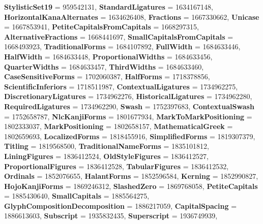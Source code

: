 \begin{DoxyCompactItemize}
{\bfseries Stylistic\+Set19} = 959542131, 
{\bfseries Standard\+Ligatures} = 1634167148, 
{\bfseries Horizontal\+Kana\+Alternates} = 1634626408, 
\newline
{\bfseries Fractions} = 1667330662, 
{\bfseries Unicase} = 1667853941, 
{\bfseries Petite\+Capitals\+From\+Capitals} = 1668297315, 
{\bfseries Alternative\+Fractions} = 1668441697, 
\newline
{\bfseries Small\+Capitals\+From\+Capitals} = 1668493923, 
{\bfseries Traditional\+Forms} = 1684107892, 
{\bfseries Full\+Width} = 1684633446, 
{\bfseries Half\+Width} = 1684633448, 
\newline
{\bfseries Proportional\+Widths} = 1684633456, 
{\bfseries Quarter\+Widths} = 1684633457, 
{\bfseries Third\+Widths} = 1684633460, 
{\bfseries Case\+Sensitive\+Forms} = 1702060387, 
\newline
{\bfseries Half\+Forms} = 1718378856, 
{\bfseries Scientific\+Inferiors} = 1718511987, 
{\bfseries Contextual\+Ligatures} = 1734962275, 
{\bfseries Discretionary\+Ligatures} = 1734962276, 
\newline
{\bfseries Historical\+Ligatures} = 1734962280, 
{\bfseries Required\+Ligatures} = 1734962290, 
{\bfseries Swash} = 1752397683, 
{\bfseries Contextual\+Swash} = 1752658787, 
\newline
{\bfseries Nlc\+Kanji\+Forms} = 1801677934, 
{\bfseries Mark\+To\+Mark\+Positioning} = 1802333037, 
{\bfseries Mark\+Positioning} = 1802658157, 
{\bfseries Mathematical\+Greek} = 1802659693, 
\newline
{\bfseries Localized\+Forms} = 1818455916, 
{\bfseries Simplified\+Forms} = 1819307379, 
{\bfseries Titling} = 1819568500, 
{\bfseries Traditional\+Name\+Forms} = 1835101812, 
\newline
{\bfseries Lining\+Figures} = 1836412524, 
{\bfseries Old\+Style\+Figures} = 1836412527, 
{\bfseries Proportional\+Figures} = 1836412528, 
{\bfseries Tabular\+Figures} = 1836412532, 
\newline
{\bfseries Ordinals} = 1852076655, 
{\bfseries Halant\+Forms} = 1852596584, 
{\bfseries Kerning} = 1852990827, 
{\bfseries Hojo\+Kanji\+Forms} = 1869246312, 
\newline
{\bfseries Slashed\+Zero} = 1869768058, 
{\bfseries Petite\+Capitals} = 1885430640, 
{\bfseries Small\+Capitals} = 1885564275, 
{\bfseries Glyph\+Composition\+Decomposition} = 1886217059, 
\newline
{\bfseries Capital\+Spacing} = 1886613603, 
{\bfseries Subscript} = 1935832435, 
{\bfseries Superscript} = 1936749939, 

\end{DoxyCompactItemize}
